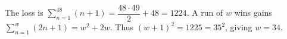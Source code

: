 The loss is $\sum_{n=1}^{48}(n+1)=\dfrac{48\cdot49}{2}+48=1224 $. A run of $ w $ wins gains $\sum_{n=1}^w(2n+1)=w^2+2w $. Thus $(w+1)^2=1225=35^2 $, giving $\boxed{w=34}$.
